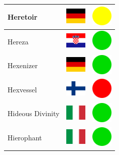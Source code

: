 \documentclass[12pt, a4paper, twoside]{report}
\begin{document}
\begin{center}
\begin{longtable}{|p{5cm}|p{2cm}|p{2cm}|}
 Heretoir                                                   & \includegraphics[width=1cm]{../img/flags/de} &   \includegraphics[width=1cm]{../likes/m} \\ \hline
 Hereza                                                     & \includegraphics[width=1cm]{../img/flags/hr} &   \includegraphics[width=1cm]{../likes/y} \\ \hline
 Hexenizer                                                  & \includegraphics[width=1cm]{../img/flags/de} &   \includegraphics[width=1cm]{../likes/y} \\ \hline
 Hexvessel                                                  & \includegraphics[width=1cm]{../img/flags/fi} &   \includegraphics[width=1cm]{../likes/n} \\ \hline
 Hideous Divinity                                           & \includegraphics[width=1cm]{../img/flags/it} &   \includegraphics[width=1cm]{../likes/y} \\ \hline
 Hierophant                                                 & \includegraphics[width=1cm]{../img/flags/it} &   \includegraphics[width=1cm]{../likes/y} \\ \hline

\end{longtable}
\end{center}
\end{document}
